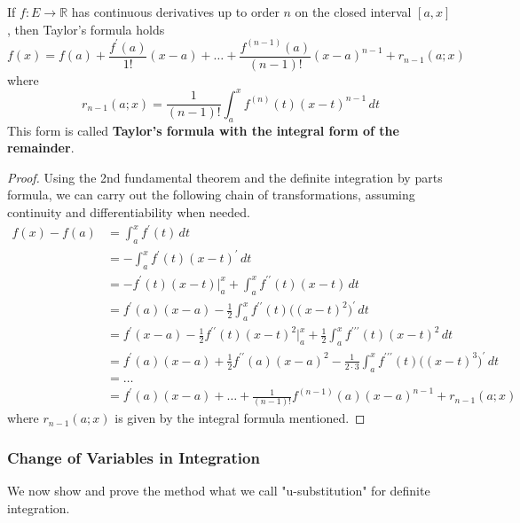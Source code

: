     \begin{theorem}
    If $f: E \longrightarrow \mathbb{R}$ has continuous derivatives up to order $n$ on the closed interval $[a, x]$, then Taylor's formula holds
    \[f(x) = f(a) + \frac{f^\prime (a)}{1!} (x - a) + \ldots + \frac{f^{(n-1)}(a)}{(n-1)!} (x - a)^{n-1} + r_{n-1}(a; x)\]
    where 
    \[r_{n-1} (a;x) = \frac{1}{(n-1)!} \int_a^x f^{(n)} (t) (x - t)^{n-1} \,dt\]
    This form is called \textbf{Taylor's formula with the integral form of the remainder}. 
    \end{theorem}
    \begin{proof}
    Using the 2nd fundamental theorem and the definite integration by parts formula, we can carry out the following chain of transformations, assuming continuity and differentiability when needed. 
    \begin{align*}
        f(x) - f(a) & = \int_a^x f^\prime (t) \,dt \\
        & = - \int_a^x f^\prime(t) (x - t)^\prime \,dt \\
        & = -f^\prime (t) (x - t)\big|_a^x + \int_a^x f^{\prime\prime} (t) (x - t) \,dt \\
        & = f^\prime (a) (x - a) - \frac{1}{2} \int_a^x f^{\prime\prime} (t) \big( (x - t)^2\big)^\prime \,dt \\
        & = f^\prime (x - a) - \frac{1}{2} f^{\prime\prime} (t) (x - t)^2 \big|_a^x + \frac{1}{2} \int_a^x f^{\prime\prime\prime} (t) (x - t)^2\,dt \\
        & = f^\prime(a) (x - a) + \frac{1}{2} f^{\prime\prime} (a) (x - a)^2 - \frac{1}{2 \cdot 3} \int_a^x f^{\prime\prime\prime} (t) \big((x - t)^3\big)^\prime\,dt \\
        & = \ldots \\
        & = f^\prime (a) (x - a) + \ldots + \frac{1}{(n-1)!} f^{(n-1)} (a)(x - a)^{n-1} + r_{n-1}(a;x)
    \end{align*}
    where $r_{n-1}(a;x)$ is given by the integral formula mentioned. 
    \end{proof}

    \subsubsection{Change of Variables in Integration}
    We now show and prove the method what we call "u-substitution" for definite integration. 

